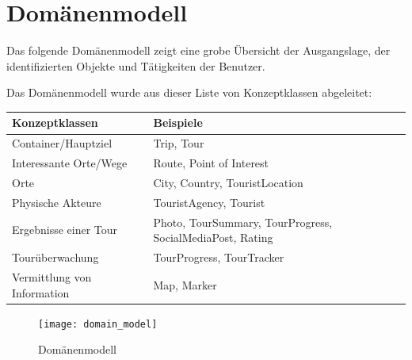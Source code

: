 \documentclass[a4paper,10pt,xetex]{article}
\begin{document}
\section{Domänenmodell}\label{domaenenmodell}
Das folgende Domänenmodell zeigt eine grobe Übersicht der Ausgangslage,
der identifizierten Objekte und Tätigkeiten der Benutzer.

Das Domänenmodell wurde aus dieser Liste von Konzeptklassen abgeleitet:

\begin{longtabu} to \textwidth { | l | X[l] | }
\hline
\textbf{Konzeptklassen} & \textbf{Beispiele} \\\hline
\endhead
Container/Hauptziel         & Trip, Tour                                               \\\hline 
Interessante Orte/Wege     & Route, Point of Interest                                \\\hline 
Orte                       & City, Country, TouristLocation                           \\\hline 
Physische Akteure          & TouristAgency, Tourist                                   \\\hline 
Ergebnisse einer Tour      & Photo, TourSummary, TourProgress, SocialMediaPost, Rating \\\hline 
Tourüberwachung           & TourProgress, TourTracker                                \\\hline
Vermittlung von Information & Map, Marker                                              \\\hline 
\end{longtabu}

\begin{figure}
  \centering
  \texttt{[image: domain\_model]}
  \caption{Domänenmodell}
\end{figure}
\end{document}
